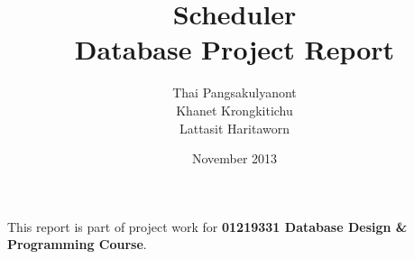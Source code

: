 \documentclass[12pt,a4paper]{article}
\begin{document}
\title{Scheduler \\ Database Project Report}
\author{Thai Pangsakulyanont \\ Khanet Krongkitichu \\ Lattasit Haritaworn}
\date{November 2013}
\maketitle

\begin{center}
\small This report is part of project work for \textbf{01219331 Database Design \& Programming Course}.
\end{center}

\pagestyle{fancyplain}
\fancyhf{}
\rhead{ \fancyplain{}{\today} }
\rfoot{ \fancyplain{}{\thepage} }

\tableofcontents
\newpage

\newcommand{\NR}{\noalign{\medskip}}
\newcommand{\Code}[1]{\texttt{#1}}
\newcommand{\Tbl}[1]{\subsubsection{Table \texttt{#1}}}
















\end{document}
